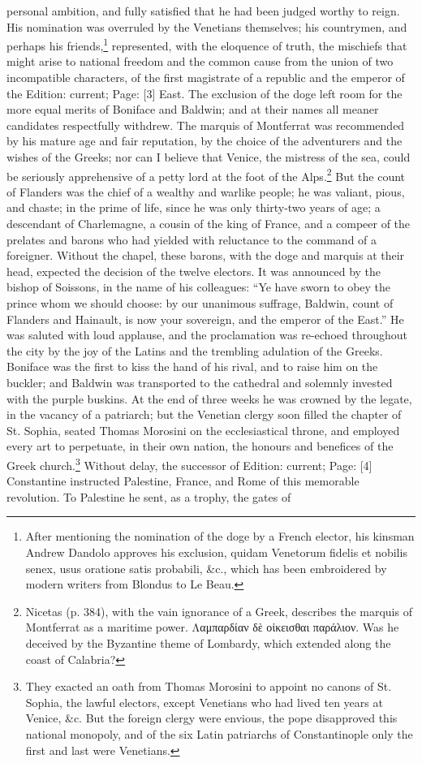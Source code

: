 personal ambition, and fully satisfied that he had been judged worthy to reign. His nomination was overruled by the Venetians themselves; his countrymen, and perhaps his friends,\footnote{After mentioning the nomination of the doge by a French elector, his kinsman Andrew Dandolo approves his exclusion, quidam Venetorum fidelis et nobilis senex, usus oratione satis probabili, \&c., which has been embroidered by modern writers from Blondus to Le Beau.} represented, with the eloquence of truth, the mischiefs that might arise to national freedom and the common cause from the union of two incompatible characters, of the first magistrate of a republic and the emperor of the Edition: current; Page: [3] East. The exclusion of the doge left room for the more equal merits of Boniface and Baldwin; and at their names all meaner candidates respectfully withdrew. The marquis of Montferrat was recommended by his mature age and fair reputation, by the choice of the adventurers and the wishes of the Greeks; nor can I believe that Venice, the mistress of the sea, could be seriously apprehensive of a petty lord at the foot of the Alps.\footnote{Nicetas (p. 384), with the vain ignorance of a Greek, describes the marquis of Montferrat as a maritime power. \textgreek{Λαμπαρδίαν δ\texthebrew{ὲ} ο\texthebrew{ἰ}κεισθαι παράλιον}. Was he deceived by the Byzantine theme of Lombardy, which extended along the coast of Calabria?} But the count of Flanders was the chief of a wealthy and warlike people; he was valiant, pious, and chaste; in the prime of life, since he was only thirty-two years of age; a descendant of Charlemagne, a cousin of the king of France, and a compeer of the prelates and barons who had yielded with reluctance to the command of a foreigner. Without the chapel, these barons, with the doge and marquis at their head, expected the decision of the twelve electors. It was announced by the bishop of Soissons, in the name of his colleagues: \texthebrew{“}Ye have sworn to obey the prince whom we should choose: by our unanimous suffrage, Baldwin, count of Flanders and Hainault, is now your sovereign, and the emperor of the East.\texthebrew{}” He was saluted with loud applause, and the proclamation was re-echoed throughout the city by the joy of the Latins and the trembling adulation of the Greeks. Boniface was the first to kiss the hand of his rival, and to raise him on the buckler; and Baldwin was transported to the cathedral and solemnly invested with the purple buskins. At the end of three weeks he was crowned by the legate, in the vacancy of a patriarch; but the Venetian clergy soon filled the chapter of St. Sophia, seated Thomas Morosini on the ecclesiastical throne, and employed every art to perpetuate, in their own nation, the honours and benefices of the Greek church.\footnote{They exacted an oath from Thomas Morosini to appoint no canons of St. Sophia, the lawful electors, except Venetians who had lived ten years at Venice, \&c. But the foreign clergy were envious, the pope disapproved this national monopoly, and of the six Latin patriarchs of Constantinople only the first and last were Venetians.} Without delay, the successor of Edition: current; Page: [4] Constantine instructed Palestine, France, and Rome of this memorable revolution. To Palestine he sent, as a trophy, the gates of 